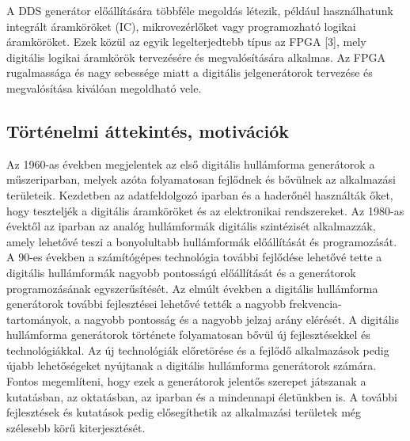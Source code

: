 \documentclass[a4paper,12pt]{article}
\begin{document}
		A DDS generátor előállítására többféle megoldás létezik, például használhatunk integrált áramköröket (IC), mikrovezérlőket vagy programozható logikai áramköröket. Ezek közül az egyik legelterjedtebb típus az FPGA [3], mely digitális logikai áramkörök tervezésére és megvalósítására alkalmas. Az FPGA rugalmassága és nagy sebessége miatt a digitális jelgenerátorok tervezése és megvalósítása kiválóan megoldható vele.
		
		\subsection{Történelmi áttekintés, motivációk}
		Az 1960-as években megjelentek az első digitális hullámforma generátorok a műszeriparban, melyek azóta folyamatosan fejlődnek és bővülnek az alkalmazási területeik. Kezdetben az adatfeldolgozó iparban és a haderőnél használták őket, hogy teszteljék a digitális áramköröket és az elektronikai rendszereket. Az 1980-as évektől az iparban az analóg hullámformák digitális szintézisét alkalmazzák, amely lehetővé teszi a bonyolultabb hullámformák előállítását és programozását.
		A 90-es években a számítógépes technológia további fejlődése lehetővé tette a digitális hullámformák nagyobb pontosságú előállítását és a generátorok programozásának egyszerűsítését. Az elmúlt években a digitális hullámforma generátorok további fejlesztései lehetővé tették a nagyobb frekvencia-tartományok, a nagyobb pontosság és a nagyobb jelzaj arány elérését.
		A digitális hullámforma generátorok története folyamatosan bővül új fejlesztésekkel és technológiákkal. Az új technológiák előretörése és a fejlődő alkalmazások pedig újabb lehetőségeket nyújtanak a digitális hullámforma generátorok számára. Fontos megemlíteni, hogy ezek a generátorok jelentős szerepet játszanak a kutatásban, az oktatásban, az iparban és a mindennapi életünkben is. A további fejlesztések és kutatások pedig elősegíthetik az alkalmazási területek még szélesebb körű kiterjesztését.
			
\end{document}
